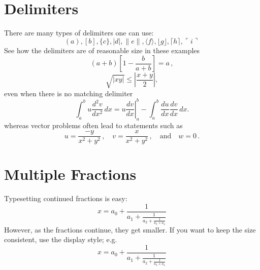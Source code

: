 \section{Delimiters}
There are many types of delimiters one can use:
\[ ( a ), [ b ], \{ c \}, | d |, \| e \|,
\langle f \rangle, \lfloor g \rfloor,
\lceil h \rceil, \ulcorner i \urcorner \]
See how the delimiters are of reasonable size in these examples
\[
        \left(a+b\right)\left[1-\frac{b}{a+b}\right]=a\,,
\]
\[
        \sqrt{|xy|}\leq\left|\frac{x+y}{2}\right|,
\]
even when there is no matching delimiter
\[
        \int_a^bu\frac{d^2v}{dx^2}\,dx
        =\left.u\frac{dv}{dx}\right|_a^b
        -\int_a^b\frac{du}{dx}\frac{dv}{dx}\,dx.
\]
whereas vector problems often lead to statements such as
\[
        u=\frac{-y}{x^2+y^2}\,,\quad
        v=\frac{x}{x^2+y^2}\,,\quad\text{and}\quad
        w=0\,.
\]
\section{Multiple Fractions}
Typesetting continued fractions is easy:
\[
x = a_0 + \frac{1}{a_1 + \frac{1}{a_2 + \frac{1}{a_3 + a_4}}}
\]
However, as the fractions continue, they get smaller. If you want to keep the size consistent, use the display style; e.g.
\[
  x = a_0 + \frac{1}{\displaystyle a_1
          + \frac{1}{\displaystyle a_2
          + \frac{1}{\displaystyle a_3 + a_4}}}
\]

